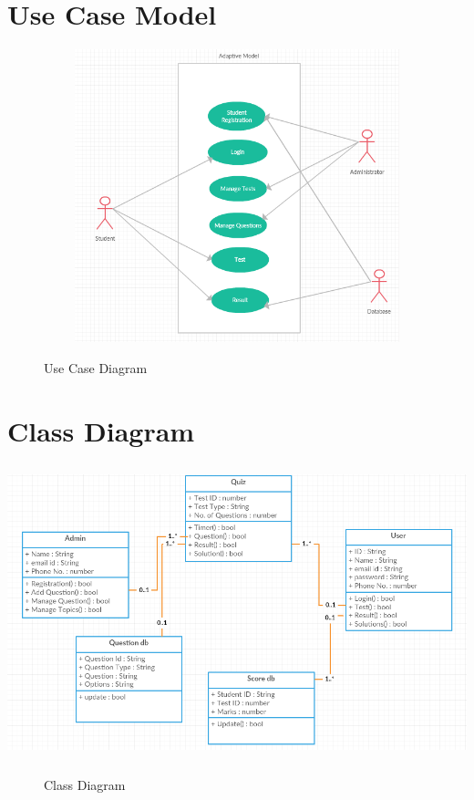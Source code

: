 \section{Use Case Model}
\begin{center}
	\includegraphics[width=13.5cm,
	height=8.5cm]{use_case.png}
	\begin{figure}[h!]
		\centering
		\caption{Use Case Diagram}%
	\end{figure}
\end{center}
\section{Class Diagram}
\begin{center}
	\includegraphics[width=13.5cm,
	height=8.5cm]{class_diagram.png}
	\begin{figure}[h!]
		\centering
		\caption{Class Diagram}%
	\end{figure}
\end{center}


